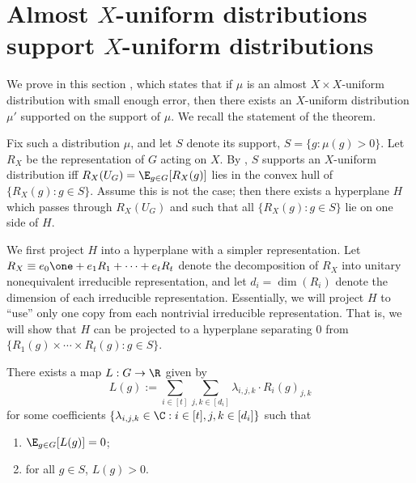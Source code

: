 \section{\texorpdfstring{Almost $X$-uniform distributions support $X$-uniform distributions}{Almost X-uniform distributions support X-uniform distributions}}
\label{sec:almost_support_uniform}

We prove in this section ,
which states that
if $\mu$ is an almost $X \times X$-uniform distribution with
small enough error, then there exists an $X$-uniform distribution $\mu'$
supported on the support of $\mu$. We recall the statement of the theorem.


Fix such a distribution $\mu$, and let $S$ denote its support, $S=\{g:
\mu(g)>0\}$. Let $R_X$ be the representation of $G$ acting on $X$. By
, $S$ supports an $X$-uniform
distribution iff $R_X(U_G)=\E_{g \in G}[R_X(g)]$ lies in the convex
hull of $\{R_X(g): g \in S\}$. Assume this is not the case; then there
exists 
%
a hyperplane 
$H$ which passes through $R_X(U_G)$ and such that
all $\{R_X(g): g \in S\}$ lie on one side of $H$.

We first project $H$ into 
%
a hyperplane 
with a simpler representation. Let
$R_X \equiv e_0 \one + e_1 R_1 + \cdots + e_t R_t$ denote the
decomposition of $R_X$ into unitary nonequivalent irreducible
representation, and let $d_i = \dim(R_i)$ denote the dimension of each irreducible representation.
Essentially, we will project $H$ to ``use'' only one copy from each nontrivial
irreducible representation. That is, we will show that $H$ can be
projected to a hyperplane separating $0$ from $\{R_1(g) \times \cdots
\times R_t(g): g \in S\}$.

\begin{proposition}\label{prop:separating_zero_R}
There exists a map $L:G \to \R$ given by
$$
L(g) := \sum_{i \in [t]} \sum_{j,k \in [d_i]}
\lambda_{i,j,k} \cdot R_i(g)_{j,k}
$$
for some coefficients $\{\lambda_{i,j,k}
\in \C: i \in [t], j,k \in [d_i]\}$ such that
\begin{enumerate}
\item $\E_{g \in G}[L(g)]=0$;
\item for all $g \in S$, $L(g)>0$.
\end{enumerate}
\end{proposition}

